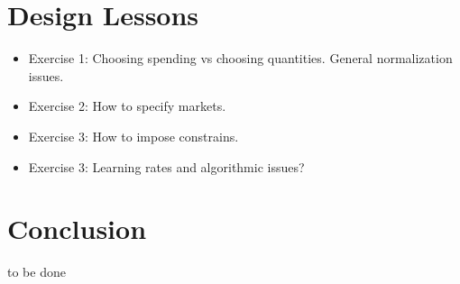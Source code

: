 \documentclass[11pt,english]{article}
\begin{document}
\section{Design Lessons}
\begin{itemize}
	\item Exercise 1: Choosing spending vs choosing quantities. General normalization issues.
	\item Exercise 2: How to specify markets.
	\item Exercise 3: How to impose constrains.
	\item Exercise 3: Learning rates and algorithmic issues?
\end{itemize}

\section{Conclusion}

to be done




\end{document}
